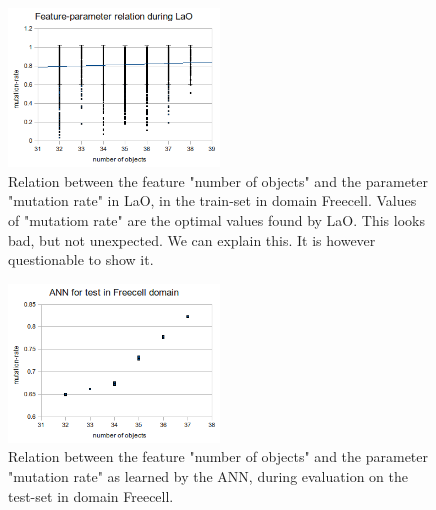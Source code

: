 \documentclass[letterpaper]{article}
\begin{document}
\begin{figure}[h!]
	\centering
	\includegraphics[width=0.5\textwidth]{results/freecell_lao_objects_mutrate.png}
	\caption{Relation between the feature "number of objects" and the parameter "mutation rate" in LaO, in the train-set in domain Freecell. Values of 		"mutatiom rate" are the optimal values found by LaO. This looks bad, but not unexpected. We can explain this. It is however questionable to show 		it.}
	\label{figure:laoobjectmutrate}  
\end{figure}


\begin{figure}[h!]
	\centering
	\includegraphics[width=0.5\textwidth]{results/freecell_test_objects_mutrate.png}
	\caption{Relation between the feature "number of objects" and the parameter "mutation rate" as learned by the ANN, during evaluation on the test-set in 		domain Freecell.}
	\label{figure:ANNobjectmutate}  
\end{figure}
\end{document}

